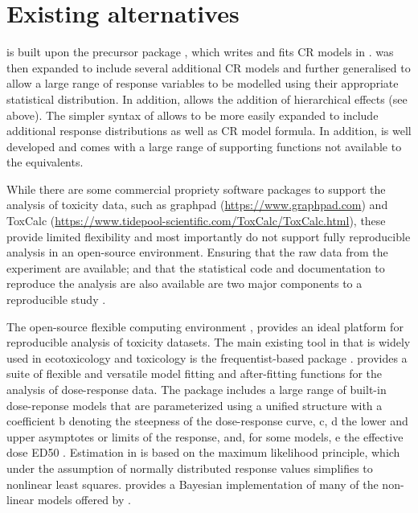 \documentclass[
  shortnames]{jss}
\begin{document}
\section[Existing alternatives]{Existing alternatives}\label{bnchmrk}

 is built upon the precursor  package  \citep{fisher2020}, which writes and fits CR models in  \citep{Plummer2003}.  was then expanded to include several additional CR models and further generalised to allow a large range of response variables to be modelled using their appropriate statistical distribution. In addition,  allows the addition of hierarchical effects (see above). The simpler syntax of  allows  to be more easily expanded to include additional response distributions as well as CR model formula. In addition,  is well developed and comes with a large range of supporting functions not available to the  equivalents.

While there are some commercial propriety software packages to support the analysis of toxicity data, such as graphpad (\url{https://www.graphpad.com}) and ToxCalc (\url{https://www.tidepool-scientific.com/ToxCalc/ToxCalc.html}), these provide limited flexibility and most importantly do not support fully reproducible analysis in an open-source environment. Ensuring that the raw data from the experiment are available; and that the statistical code and documentation to reproduce the analysis are also available are two major components to a reproducible study \citep{peng2015}.

The open-source flexible computing environment , provides an ideal platform for reproducible analysis of toxicity datasets. The main existing tool in  that is widely used in ecotoxicology and toxicology is the frequentist-based package  \citep{Ritz2016}.  provides a suite of flexible and versatile model fitting and after-fitting functions for the analysis of dose-response data. The package includes a large range of built-in dose-reponse models that are parameterized using a unified structure with a coefficient b denoting the steepness of the dose-response curve, c, d the lower and upper asymptotes or limits of the response, and, for some models, e the effective dose ED50 \citep{Ritz2016}. Estimation in  is based on the maximum likelihood principle, which under the assumption of normally distributed response values simplifies to nonlinear least squares.  provides a Bayesian implementation of many of the non-linear models offered by .
\end{document}
